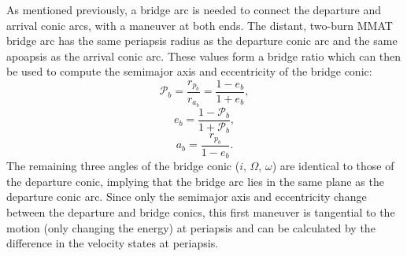 As mentioned previously, a bridge arc is needed to connect the departure and arrival conic arcs,
with a maneuver at both ends. The distant, two-burn MMAT bridge arc has the same periapsis radius
as the departure conic arc and the same apoapsis as the arrival conic arc. These values form a
bridge ratio which can then be used to compute the semimajor axis and eccentricity of the bridge
conic:
\begin{equation}
    \mathcal{P}_{b}=\frac{r_{p_{b}}}{r_{a_{b}}}=\frac{1-e_{b}}{1+e_{b}},
    \label{eq:bridgeratio}
\end{equation}
\begin{equation}
    e_{b}=\frac{1-\mathcal{P}_{b}}{1+\mathcal{P}_{b}},
    \label{eq:bridgeeccentricity}
\end{equation}
\begin{equation}
    a_{b}=\frac{r_{p_{b}}}{1-e_{b}}.
    \label{eq:bridgesemimajoraxis}
\end{equation}
The remaining three angles of the bridge conic ($i$, $\Omega$, $\omega$) are identical to those of
the departure conic, implying that the bridge arc lies in the same plane as the departure conic
arc. Since only the semimajor axis and eccentricity change between the departure and bridge conics,
this first maneuver is tangential to the motion (only changing the energy) at periapsis and can be
calculated by the difference in the velocity states at periapsis.

